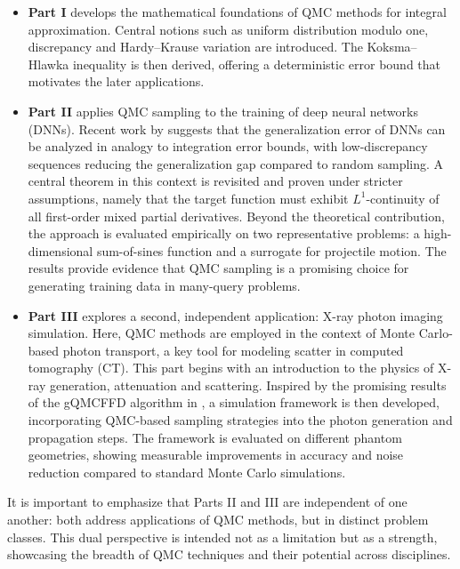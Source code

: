 \begin{itemize}
    \item \textbf{Part I} develops the mathematical foundations of QMC methods for integral approximation. Central notions such as uniform distribution modulo one, discrepancy and Hardy--Krause variation are introduced. The Koksma--Hlawka inequality is then derived, offering a deterministic error bound that motivates the later applications. 
    
    \item \textbf{Part II} applies QMC sampling to the training of deep neural networks (DNNs). Recent work by \citeauthor{mishra2021enhancing} \cite{mishra2021enhancing} suggests that the generalization error of DNNs can be analyzed in analogy to integration error bounds, with low-discrepancy sequences reducing the generalization gap compared to random sampling. A central theorem in this context is revisited and proven under stricter assumptions, namely that the target function must exhibit $L^1$-continuity of all first-order mixed partial derivatives. Beyond the theoretical contribution, the approach is evaluated empirically on two representative problems: a high-dimensional sum-of-sines function and a surrogate for projectile motion. The results provide evidence that QMC sampling is a promising choice for generating training data in many-query problems.
    
    \item \textbf{Part III} explores a second, independent application: X-ray photon imaging simulation. Here, QMC methods are employed in the context of Monte Carlo-based photon transport, a key tool for modeling scatter in computed tomography (CT). This part begins with an introduction to the physics of X-ray generation, attenuation and scattering. Inspired by the promising results of the gQMCFFD algorithm in \cite{qmcXray2023}, a simulation framework is then developed, incorporating QMC-based sampling strategies into the photon generation and propagation steps. The framework is evaluated on different phantom geometries, showing measurable improvements in accuracy and noise reduction compared to standard Monte Carlo simulations. 
\end{itemize}

It is important to emphasize that Parts II and III are independent of one another: both address applications of QMC methods, but in distinct problem classes. This dual perspective is intended not as a limitation but as a strength, showcasing the breadth of QMC techniques and their potential across disciplines.

